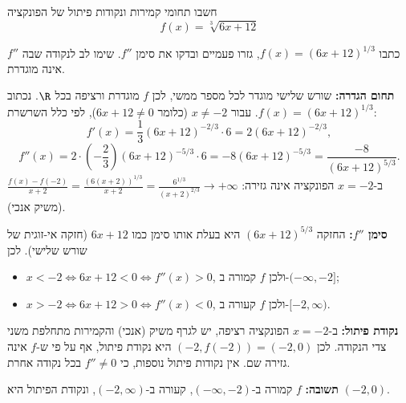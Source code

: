
\begin{question}
חשבו תחומי קמירות ונקודות פיתול של הפונקציה
\[ f(x) = \sqrt[3]{6x + 12} \]
\end{question}

\begin{hint}
כתבו $f(x) = (6x + 12)^{1/3}$, גזרו פעמיים ובדקו את סימן $f''$. שימו לב לנקודה שבה $f''$ אינה מוגדרת.
\end{hint}

\begin{solution}
\textbf{תחום הגדרה:} שורש שלישי מוגדר לכל מספר ממשי, לכן $f$ מוגדרת ורציפה בכל $\R$. נכתוב $f(x) = (6x + 12)^{1/3}$. עבור $x \ne -2$ (כלומר $6x + 12 \ne 0$), לפי כלל השרשרת:
\[ f'(x) = \frac13 (6x + 12)^{-2/3} \cdot 6 = 2(6x + 12)^{-2/3}, \]
\[ f''(x) = 2\cdot\left(-\frac23\right)(6x + 12)^{-5/3} \cdot 6 = -8(6x + 12)^{-5/3} = \frac{-8}{(6x + 12)^{5/3}}. \]
ב-$x = -2$ הפונקציה אינה גזירה: $\frac{f(x) - f(-2)}{x + 2} = \frac{(6(x+2))^{1/3}}{x + 2} = \frac{6^{1/3}}{(x + 2)^{2/3}} \to +\infty$ (משיק אנכי).

\textbf{סימן $f''$:} החזקה $(6x + 12)^{5/3}$ היא בעלת אותו סימן כמו $6x + 12$ (חזקה אי-זוגית של שורש שלישי). לכן
\begin{itemize}
  \item $x < -2 \iff 6x + 12 < 0 \iff f''(x) > 0$, ולכן $f$ קמורה ב-$(-\infty, -2]$;
  \item $x > -2 \iff 6x + 12 > 0 \iff f''(x) < 0$, ולכן $f$ קעורה ב-$[-2, \infty)$.
\end{itemize}

\textbf{נקודת פיתול:} ב-$x = -2$ הפונקציה רציפה, יש לגרף משיק (אנכי) והקמירות מתחלפת משני צדי הנקודה. לכן $(-2, f(-2)) = (-2, 0)$ היא נקודת פיתול, אף על פי ש-$f$ אינה גזירה שם. אין נקודות פיתול נוספות, כי $f'' \ne 0$ בכל נקודה אחרת.

\textbf{תשובה:} $f$ קמורה ב-$(-\infty, -2)$, קעורה ב-$(-2, \infty)$, ונקודת הפיתול היא $(-2, 0)$.
\end{solution}
